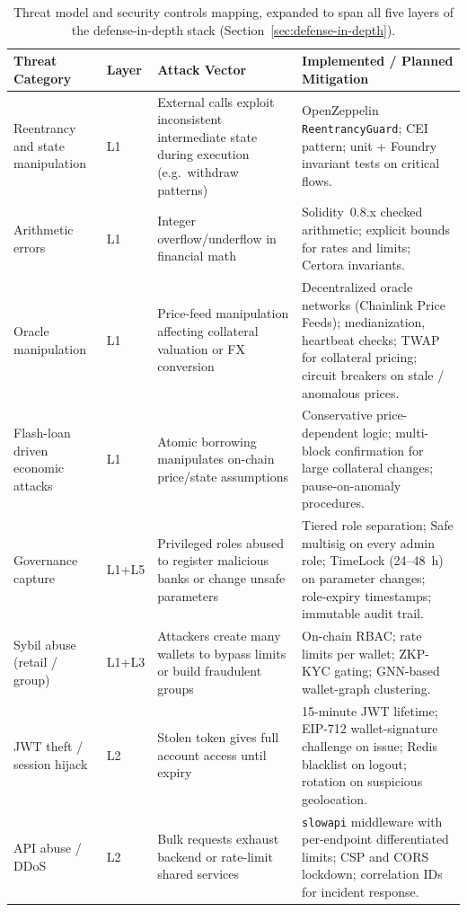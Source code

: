 \documentclass[12pt,a4paper]{report}
\begin{document}
\begin{table}[H]
\centering
\caption{Threat model and security controls mapping, expanded to span all five layers of the defense-in-depth stack (Section~\ref{sec:defense-in-depth}).}
\label{tab:threat-model}
\begin{tabular}{p{2.6cm}p{2.0cm}p{4.5cm}p{4.8cm}}
\hline
\textbf{Threat Category} & \textbf{Layer} & \textbf{Attack Vector} & \textbf{Implemented / Planned Mitigation} \\
\hline
Reentrancy and state manipulation & L1 & External calls exploit inconsistent intermediate state during execution (e.g.\ withdraw patterns) & OpenZeppelin \texttt{ReentrancyGuard}; CEI pattern; unit + Foundry invariant tests on critical flows. \\
\hline
Arithmetic errors & L1 & Integer overflow/underflow in financial math & Solidity~0.8.x checked arithmetic; explicit bounds for rates and limits; Certora invariants. \\
\hline
Oracle manipulation & L1 & Price-feed manipulation affecting collateral valuation or FX conversion & Decentralized oracle networks (Chainlink Price Feeds); medianization, heartbeat checks; TWAP for collateral pricing; circuit breakers on stale / anomalous prices. \\
\hline
Flash-loan driven economic attacks & L1 & Atomic borrowing manipulates on-chain price/state assumptions & Conservative price-dependent logic; multi-block confirmation for large collateral changes; pause-on-anomaly procedures. \\
\hline
Governance capture & L1+L5 & Privileged roles abused to register malicious banks or change unsafe parameters & Tiered role separation; Safe multisig on every admin role; TimeLock (24--48~h) on parameter changes; role-expiry timestamps; immutable audit trail. \\
\hline
Sybil abuse (retail / group) & L1+L3 & Attackers create many wallets to bypass limits or build fraudulent groups & On-chain RBAC; rate limits per wallet; ZKP-KYC gating; GNN-based wallet-graph clustering. \\
\hline
JWT theft / session hijack & L2 & Stolen token gives full account access until expiry & 15-minute JWT lifetime; EIP-712 wallet-signature challenge on issue; Redis blacklist on logout; rotation on suspicious geolocation. \\
\hline
API abuse / DDoS & L2 & Bulk requests exhaust backend or rate-limit shared services & \texttt{slowapi} middleware with per-endpoint differentiated limits; CSP and CORS lockdown; correlation IDs for incident response. \\

\end{tabular}
\end{table}
\end{document}
